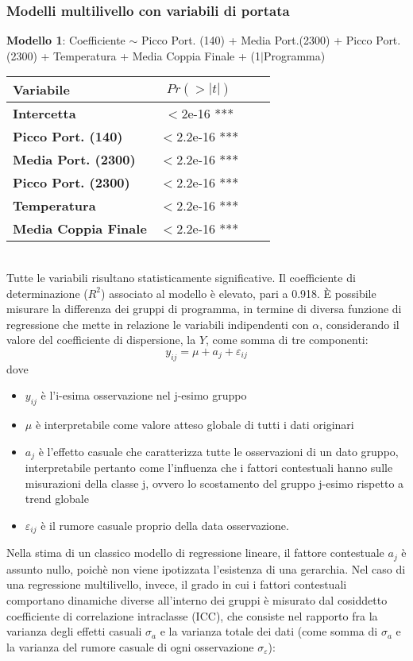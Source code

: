 \documentclass[fleqn,10pt]{SelfArx} %
\begin{document}
\subsubsection{Modelli multilivello con variabili di portata}
\textbf{Modello 1}:  Coefficiente $\sim$  Picco Port. (140) + Media Port.(2300) + Picco Port. (2300) + Temperatura + Media Coppia Finale + (1$\mid$Programma)
{\begin{table}[h] 
\centering
\begin{tabular}[t]{lccc}
\toprule 
Variabile&$Pr(> |t|)$\\
\midrule 
\textbf{Intercetta}&$<$2e-16 ***&\\
\textbf{Picco Port. (140)}&$<$2.2e-16 ***\\ 
\textbf{Media Port. (2300)}&$<$2.2e-16 ***\\ 
\textbf{Picco Port. (2300)}&$<$2.2e-16 ***\\ 
\textbf{Temperatura}&$<$2.2e-16 ***\\
\textbf{Media Coppia Finale}&$<$2.2e-16 ***\\
\bottomrule 
\end{tabular}
\end{table}}\\
Tutte le variabili risultano statisticamente significative. Il coefficiente di determinazione ($R^2$) associato al modello è elevato, pari a 0.918.
È possibile misurare la differenza dei gruppi di programma, in termine di diversa funzione di regressione che mette in relazione le variabili indipendenti con $\alpha$, considerando il valore del coefficiente di dispersione, la $Y$, come somma di tre componenti:
\begin{equation}
    y_{ij}=\mu+a_j+\varepsilon_{ij}
\end{equation}
dove
\begin{itemize}
    \item $y_{ij}$ è l'i-esima osservazione nel j-esimo gruppo 
    \item $\mu$ è interpretabile come valore atteso globale di tutti i dati originari
    \item $a_j$ è l'effetto casuale che caratterizza tutte le osservazioni di un dato gruppo, interpretabile pertanto come l'influenza che i fattori contestuali hanno sulle misurazioni della classe j, ovvero lo scostamento del gruppo j-esimo rispetto a trend globale
    \item $\varepsilon_{ij}$ è il rumore casuale proprio della data osservazione.
\end{itemize}
Nella stima di un classico modello di regressione lineare, il fattore contestuale $a_j$ è assunto nullo, poichè non viene ipotizzata l'esistenza di una gerarchia. Nel caso di una regressione multilivello, invece, il grado in cui i fattori contestuali comportano dinamiche diverse all'interno dei gruppi è misurato dal cosiddetto coefficiente di correlazione intraclasse (ICC), che consiste nel rapporto fra la varianza degli effetti casuali $\sigma_a$ e la varianza totale dei dati (come somma di $\sigma_a$ e la varianza del rumore casuale di ogni osservazione $\sigma_{\varepsilon}$):
\end{document}
